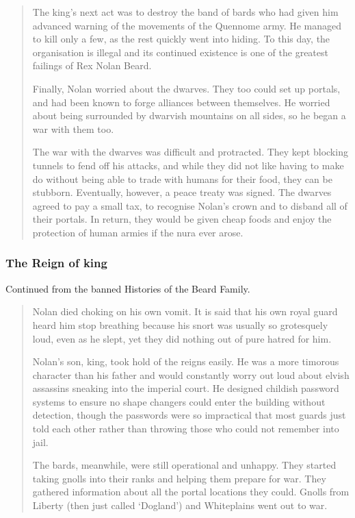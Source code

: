 \begin{multicols}{2}
\begin{quotation}
	The king's next act was to destroy the band of bards who had given him advanced warning of the movements of the Quennome army.
	He managed to kill only a few, as the rest quickly went into hiding.
	To this day, the organisation is illegal and its continued existence is one of the greatest failings of Rex Nolan Beard.

	Finally, Nolan worried about the dwarves.
	They too could set up portals, and had been known to forge alliances between themselves.
	He worried about being surrounded by dwarvish mountains on all sides, so he began a war with them too.

	The war with the dwarves was difficult and protracted.
	They kept blocking tunnels to fend off his attacks, and while they did not like having to make do without being able to trade with humans for their food, they can be stubborn.
	Eventually, however, a peace treaty was signed.
	The dwarves agreed to pay a small tax, to recognise Nolan's crown and to disband all of their portals.
	In return, they would be given cheap foods and enjoy the protection of human armies if the nura ever arose.

\end{quotation}

\subsubsection{The Reign of \gls{king}}

Continued from the banned Histories of the Beard Family.

\begin{quotation}

	Nolan died choking on his own vomit.
	It is said that his own royal guard heard him stop breathing because his snort was usually so grotesquely loud, even as he slept, yet they did nothing out of pure hatred for him.

	Nolan's son, \gls{king}, took hold of the reigns easily.
	He was a more timorous character than his father and would constantly worry out loud about elvish assassins sneaking into the imperial court.
	He designed childish password systems to ensure no shape changers could enter the building without detection, though the passwords were so impractical that most guards just told each other rather than throwing those who could not remember into jail.

	The bards, meanwhile, were still operational and unhappy.
	They started taking gnolls into their ranks and helping them prepare for war.
	They gathered information about all the portal locations they could.
	Gnolls from Liberty (then just called `Dogland') and Whiteplains went out to war.


\end{quotation}
\end{multicols}
